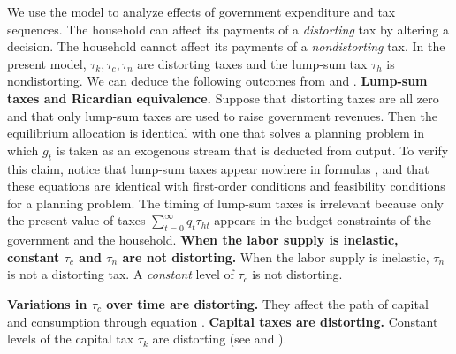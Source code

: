    We use the model  to analyze  effects of
government expenditure and tax sequences.
The household can affect its payments of a {\it distorting\/} tax
by altering a decision. The household cannot affect its payments of a {\it nondistorting\/}
tax.
In the present model,  $\tau_k, \tau_c, \tau_n$ are distorting taxes
and the lump-sum tax $\tau_h$ is nondistorting.
%
%
We can deduce
 the following
outcomes
from  and .
\medskip
{}  {\bf Lump-sum taxes and Ricardian equivalence.}
Suppose that  distorting taxes are all zero and that
only lump-sum taxes are used to raise government revenues.  Then
the equilibrium allocation is identical with  one that solves a
planning problem in which $g_t$ is taken as an exogenous
stream that is deducted from output.
To verify this claim, notice that lump-sum taxes appear nowhere
in formulas , and that these equations are identical
with first-order conditions and feasibility conditions for
a planning problem.
The timing of lump-sum taxes is irrelevant because only
the present value of taxes $\sum_{t=0}^\infty q_t \tau_{ht}$ appears in
the budget constraints of the government and the household.
\medskip
{}  {\bf
When the labor supply is inelastic,
 constant $\tau_c$ and $\tau_n$ are not distorting.}
 When the labor supply is inelastic, $\tau_n$  is not
a distorting tax.    A  {\it constant\/} level of    $\tau_c$ is
not distorting.


\medskip
{}  {\bf Variations in $\tau_c$ over time are distorting.}
They affect the path of capital and consumption through equation
.
\medskip
{}  {\bf Capital taxes are distorting.}
 Constant levels of  the capital tax $\tau_k$ are distorting (see  and
).


%

